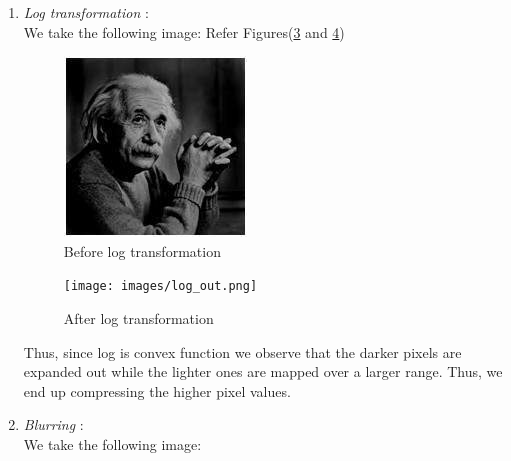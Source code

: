 \documentclass[conference]{IEEEtran}
\begin{document}
{{\begin{enumerate}
\begin{figure}[htbp]
\caption{Before gamma correct}
\label{fig:gamma_1}
\end{figure}
    \begin{figure}[htbp]
\centerline{\texttt{[image: images/gamma\_out.png]}}
\caption{After gamma correct}
\label{fig:gamma_2}
\end{figure}
\newline Since $\gamma = 2$, we see that the lighter pixels have been mapped to the darker ones and hence we observe a much darker image for $\gamma >1$.(referring to figures \ref{fig:gamma_1} and \ref{fig:gamma_2})
\item \textit{Log transformation} : \\
 We take the following image: Refer Figures(\ref{fig:log_1} and \ref{fig:log_2})
     \begin{figure}[htbp]
\centerline{\includegraphics[scale = 0.5]{images/log.jpg}}
\caption{Before log transformation}
\label{fig:log_1}
\end{figure}
    \begin{figure}[htbp]
\centerline{\texttt{[image: images/log\_out.png]}}
\caption{After log transformation}
\label{fig:log_2}
\end{figure}
\newline Thus, since log is convex function we observe that the darker pixels are expanded out while the lighter ones are mapped over a larger range. Thus, we end up compressing the higher pixel values.
\item \textit{Blurring} :\\ 
 We take the following image: 
     \begin{figure}[htbp]

\end{figure}
\end{enumerate}}}
\end{document}
